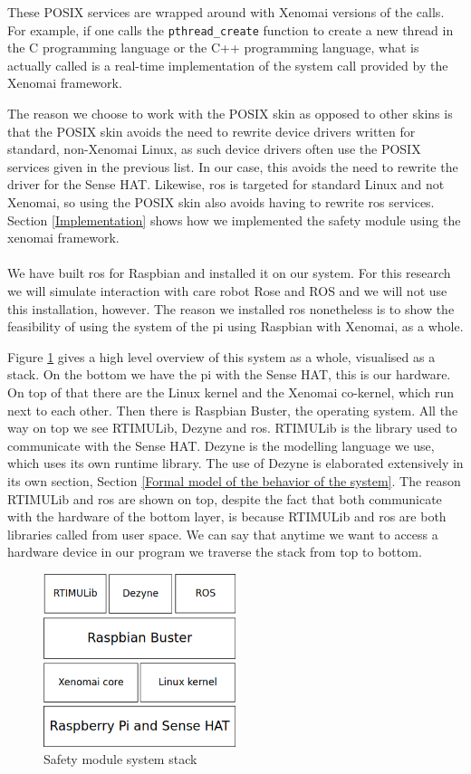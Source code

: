 \documentclass[12pt]{scrreprt}
\begin{document}
These POSIX services are wrapped around with Xenomai versions of the calls. For example, if one calls the \texttt{pthread_create} function to create a new thread in the C programming language or the C++ programming language, what is actually called is a real-time implementation of the system call provided by the Xenomai framework.
\par
The reason we choose to work with the POSIX skin as opposed to other skins is that the POSIX skin avoids the need to rewrite device drivers written for standard, non-Xenomai Linux, as such device drivers often use the POSIX services given in the previous list. In our case, this avoids the need to rewrite the driver for the Sense HAT. Likewise, \acrshort{ros} is targeted for standard Linux and not Xenomai, so using the POSIX skin also avoids having to rewrite \acrshort{ros} services. Section \ref{Implementation} shows how we implemented the safety module using the xenomai framework.
\\\\
We have built \acrshort{ros} for Raspbian and installed it on our system. For this research we will simulate interaction with care robot Rose and ROS and we will not use this installation, however. The reason we installed \acrshort{ros} nonetheless is to show the feasibility of using the system of the \gls{pi} using Raspbian with Xenomai, as a whole.
\par
Figure \ref{fig:stack} gives a high level overview of this system as a whole, visualised as a stack. On the bottom we have the \gls{pi} with the Sense HAT, this is our hardware. On top of that there are the Linux kernel and the Xenomai co-kernel, which run next to each other. Then there is Raspbian Buster, the operating system. All the way on top we see RTIMULib, Dezyne and \acrshort{ros}. RTIMULib is the library used to communicate with the Sense HAT. Dezyne is the modelling language we use, which uses its own runtime library. The use of Dezyne is elaborated extensively in its own section, Section \ref{Formal model of the behavior of the system}. The reason RTIMULib and \acrshort{ros} are shown on top, despite the fact that both communicate with the hardware of the bottom layer, is because RTIMULib and \acrshort{ros} are both libraries called from user space. We can say that anytime we want to access a hardware device in our program we traverse the stack from top to bottom.

\begin{figure}[H]
    \centering
    \includegraphics[width=0.5\textwidth]{Figures/results/os_environment_stack.png}
    \caption{Safety module system stack}
    \label{fig:stack}
\end{figure}
\end{document}

